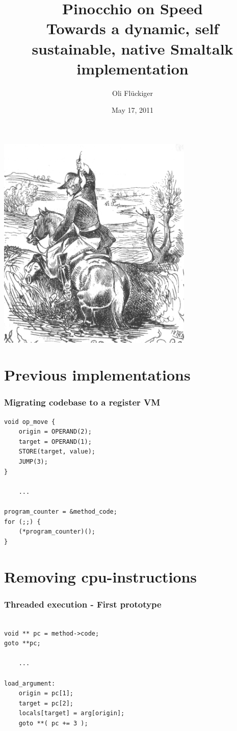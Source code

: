\documentclass{beamer}
\title[Pinocchio on Speed]{Pinocchio on Speed \\ Towards a dynamic, self sustainable, native Smaltalk implementation}
\author{Oli Flückiger}
\institute{scg.unibe.ch}
\date{May 17, 2011}
\begin{document}
\begin{frame}
\titlepage
\end{frame}

\begin{frame}
\begin{center}\includegraphics[width=0.7\textwidth]{muenchhausen.png}\end{center}
\end{frame}

\section{Previous implementations}

\lstset{language=C}

\begin{frame}[fragile]
    \frametitle{Migrating codebase to a register VM}
    \begin{lstlisting}
void op_move {
    origin = OPERAND(2);
    target = OPERAND(1);
    STORE(target, value);
    JUMP(3);
}

    ...

program_counter = &method_code;
for (;;) {
    (*program_counter)();
}
    \end{lstlisting}
\end{frame}

\section{Removing cpu-instructions}

\begin{frame}[fragile]
    \frametitle{Threaded execution - First prototype}
    \begin{lstlisting}

void ** pc = method->code;
goto **pc;
            
    ...

load_argument:
    origin = pc[1];
    target = pc[2];
    locals[target] = arg[origin];
    goto **( pc += 3 );

    \end{lstlisting}
\end{frame}
\end{document}
